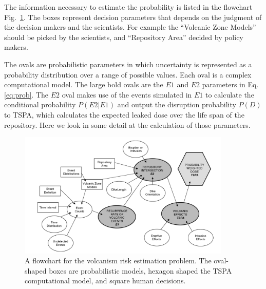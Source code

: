 \documentclass[nofootinbib,preprint,aps]{revtex4-1}
\begin{document}
        The information necessary to estimate the probability is listed in the flowchart Fig.~\ref{fig:volcanos}.
        The boxes represent decision parameters that depends on the judgment of the decision makers and
        the scientists. For example the ``Volcanic Zone Models'' should be picked by the scientists, and
        ``Repository Area'' decided by policy makers.
        
        The ovals are probabilistic parameters in which uncertainty
        is represented as a probability distribution over a range of possible values.
        Each oval is a complex computational model.
        The large bold ovals are the $E1$ and $E2$ parameters in Eq.\ref{eq:prob}.
        The $E2$ oval makes
        use of the events simulated in $E1$ to calculate the conditional probability $P(E2|E1)$ and output
        the disruption probability $P(D)$ to TSPA, which calculates the expected leaked dose over the
        life span of the repository. Here we look in some detail at the calculation of those parameters.
        \begin{figure}[h]
            \centering
            \includegraphics[width=0.9\textwidth]{volcano.png}
            \caption{A flowchart for the volcanism risk estimation problem. The oval-shaped
            boxes are probabilistic models, hexagon shaped the TSPA computational model, and
        square human decisions.\cite{cv14}}
            \label{fig:volcanos}
        \end{figure}
\end{document}
